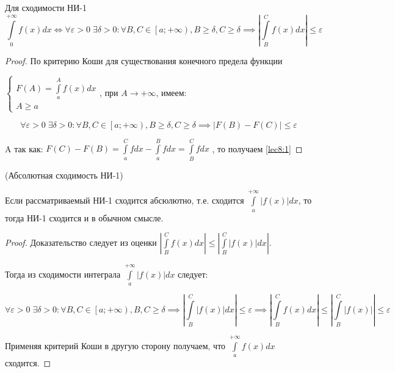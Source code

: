 \documentclass[../../main.tex]{subfiles}
\begin{document}
\begin {thm}
Для сходимости НИ-1
 \begin{equation} \label{lec8:1}
  \int\limits_{0}^{+\infty} f(x)dx \iff \forall \varepsilon > 0 \;  \exists \delta > 0 : \forall B, C \in \left[a; +\infty\right), B \geq \delta, C \geq \delta \implies \left| \int\limits_{B}^{C} f(x)dx \right| \leq \varepsilon
 \end{equation}
\end {thm}

\begin{proof}
По критерию Коши для существования конечного предела функции
 
$\begin{cases}
  F(A) = \displaystyle\int\limits_{a}^{A}f(x)dx\\
  A \geq a
 \end{cases}$, при $A \to +\infty$, имеем:
 
 \[\forall \varepsilon > 0 \; \exists \delta > 0 : \forall B, C \in \left[a; +\infty \right), B \geq \delta, C \geq \delta \implies \left|F(B) - F(C) \right| \leq \varepsilon\]
 
 A так как:
 $F(C) - F(B) = \displaystyle\int\limits_{a}^{C}fdx - \displaystyle\int\limits_{a}^{B}fdx = \int\limits_{B}^{C}fdx$
 , то получаем \eqref{lec8:1}
\end{proof}

\begin{crl}
 (Абсолютная сходимость НИ-1)
 
 Если рассматриваемый НИ-1 сходится абсюлютно, т.е. сходится
 $\displaystyle\int\limits_{a}^{+\infty}|f(x)|dx$, то тогда НИ-1 сходится и в обычном смысле.
 
 \begin{proof}
 Доказательство следует из оценки
$\left|\displaystyle\int\limits_{B}^{C}f(x)dx \right| \leq \left|\displaystyle\int\limits_{B}^{C}|f(x)|dx \right|$.

Тогда из сходимости интеграла $\displaystyle\int\limits_{a}^{+\infty}\left| f(x) \right| dx $ следует:

\[\forall \varepsilon > 0 \; \exists \delta > 0 : \forall B, C \in \left[a; +\infty \right), B, C \geq \delta \implies \left| \int\limits_{B}^{C} \left| f(x) \right| dx \right| \leq \varepsilon \implies \left| \int\limits_{B}^{C} f(x) dx \right| \leq \left|\int\limits_{B}^{C} \left| f(x) \right| \right| \leq \varepsilon\]

Применяя критерий Коши в другую сторону получаем, что $\displaystyle\int\limits_{a}^{+\infty}f(x)dx$ сходится.

 \end{proof}    
\end{crl}
\end{document}
